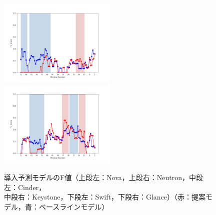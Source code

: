 \documentclass[11pt]{jreport}
\begin{document}
\begin{figure}[H]
\begin{minipage}{\textwidth}
\begin{center}
    \includegraphics[width=0.495\textwidth]{Uenaka_fig/RQ1_result/Swift_merge_F1.pdf}
    \includegraphics[width=0.495\textwidth]{Uenaka_fig/RQ1_result/Glance_merge_F1.pdf}
    \caption{導入予測モデルのF値（上段左：Nova，上段右：Neutron，中段左：Cinder，\\ 中段右：Keystone，下段左：Swift，下段右：Glance）（赤：提案モデル，青：ベースラインモデル）}
    \label{fig:merge_f}
\end{center}
\vspace{0.08\textheight}
\end{minipage}
\end{figure}
\end{document}
